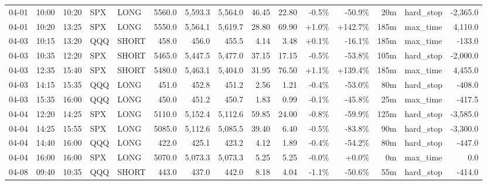 \documentclass[11pt,a4paper,twoside]{article}
\begin{document}
\begin{landscape}
\begin{center}
\begin{longtable}{>{\color{txtmain}}l l l l l r r r r r r r r >{\color{txtmain}}l r}
04-01 & 10:00 & 10:20 & SPX & LONG & 5560.0 & 5,593.3 & 5,564.0 & 46.45 & 22.80 & \textcolor{lossred}{-0.5\%} & \textcolor{lossred}{-50.9\%} & 20m & hard\_stop & \textcolor{lossred}{-2,365.0} \\
04-01 & 10:20 & 13:25 & SPX & LONG & 5550.0 & 5,564.1 & 5,619.7 & 28.80 & 69.90 & \textcolor{wingreen}{+1.0\%} & \textcolor{wingreen}{+142.7\%} & 185m & max\_time & \textcolor{wingreen}{4,110.0} \\
04-03 & 10:15 & 13:20 & QQQ & SHORT & 458.0 & 456.0 & 455.5 & 4.14 & 3.48 & \textcolor{wingreen}{+0.1\%} & \textcolor{lossred}{-16.1\%} & 185m & max\_time & \textcolor{lossred}{-133.0} \\
04-03 & 10:35 & 12:20 & SPX & SHORT & 5465.0 & 5,447.5 & 5,477.0 & 37.15 & 17.15 & \textcolor{lossred}{-0.5\%} & \textcolor{lossred}{-53.8\%} & 105m & hard\_stop & \textcolor{lossred}{-2,000.0} \\
04-03 & 12:35 & 15:40 & SPX & SHORT & 5480.0 & 5,463.1 & 5,404.0 & 31.95 & 76.50 & \textcolor{wingreen}{+1.1\%} & \textcolor{wingreen}{+139.4\%} & 185m & max\_time & \textcolor{wingreen}{4,455.0} \\
04-03 & 14:15 & 15:35 & QQQ & LONG & 451.0 & 452.8 & 451.2 & 2.56 & 1.21 & \textcolor{lossred}{-0.4\%} & \textcolor{lossred}{-53.0\%} & 80m & hard\_stop & \textcolor{lossred}{-408.0} \\
04-03 & 15:35 & 16:00 & QQQ & LONG & 450.0 & 451.2 & 450.7 & 1.83 & 0.99 & \textcolor{lossred}{-0.1\%} & \textcolor{lossred}{-45.8\%} & 25m & max\_time & \textcolor{lossred}{-417.5} \\
04-04 & 12:20 & 14:25 & SPX & LONG & 5110.0 & 5,152.4 & 5,112.6 & 59.85 & 24.00 & \textcolor{lossred}{-0.8\%} & \textcolor{lossred}{-59.9\%} & 125m & hard\_stop & \textcolor{lossred}{-3,585.0} \\
04-04 & 14:25 & 15:55 & SPX & LONG & 5085.0 & 5,112.6 & 5,085.5 & 39.40 & 6.40 & \textcolor{lossred}{-0.5\%} & \textcolor{lossred}{-83.8\%} & 90m & hard\_stop & \textcolor{lossred}{-3,300.0} \\
04-04 & 14:40 & 16:00 & QQQ & LONG & 422.0 & 425.1 & 423.2 & 4.12 & 1.89 & \textcolor{lossred}{-0.4\%} & \textcolor{lossred}{-54.2\%} & 80m & hard\_stop & \textcolor{lossred}{-447.0} \\
04-04 & 16:00 & 16:00 & SPX & LONG & 5070.0 & 5,073.3 & 5,073.3 & 5.25 & 5.25 & \textcolor{lossred}{-0.0\%} & \textcolor{wingreen}{+0.0\%} & 0m & max\_time & \textcolor{wingreen}{0.0} \\
04-08 & 09:40 & 10:35 & QQQ & SHORT & 443.0 & 437.0 & 442.0 & 8.18 & 4.04 & \textcolor{lossred}{-1.1\%} & \textcolor{lossred}{-50.6\%} & 55m & hard\_stop & \textcolor{lossred}{-414.0} \\

\end{longtable}
\end{center}
\end{landscape}
\end{document}
